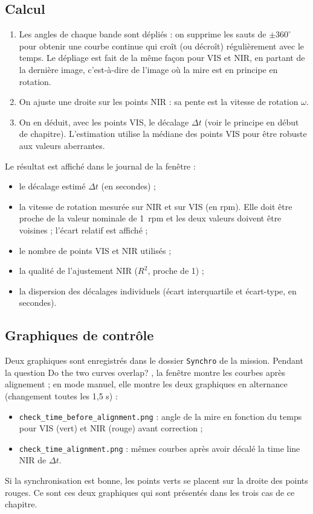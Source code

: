 \documentclass[a4paper,11pt]{report}
\begin{document}
\subsection*{Calcul}
\begin{enumerate}
  \item Les angles de chaque bande sont \og dépliés \fg : on supprime les sauts de $\pm 360^\circ$ pour obtenir une courbe continue qui croît (ou décroît) régulièrement avec le temps. Le dépliage est fait de la même façon pour VIS et NIR, en partant de la dernière image, c'est-à-dire de l'image où la mire est en principe en rotation.
  \item On ajuste une droite sur les points NIR : sa pente est la vitesse de rotation $\omega$.
  \item On en déduit, avec les points VIS, le décalage $\Delta t$ (voir le principe en début de chapitre). L'estimation utilise la médiane des points VIS pour être robuste aux valeurs aberrantes.
\end{enumerate}
Le résultat est affiché dans le journal de la fenêtre :
\begin{itemize}
  \item le décalage estimé $\Delta t$ (en secondes) ;
  \item la vitesse de rotation mesurée sur NIR et sur VIS (en rpm). Elle doit être proche de la valeur nominale de 1~rpm et les deux valeurs doivent être voisines ; l'écart relatif est affiché ;
  \item le nombre de points VIS et NIR utilisés ;
  \item la qualité de l'ajustement NIR ($R^2$, proche de 1) ;
  \item la dispersion des décalages individuels (écart interquartile et écart-type, en secondes).
\end{itemize}

\subsection*{Graphiques de contrôle}
Deux graphiques sont enregistrés dans le dossier \texttt{Synchro} de la mission. Pendant la question \og Do the two curves overlap? \fg, la fenêtre montre les courbes après alignement ; en mode manuel, elle montre les deux graphiques en alternance (changement toutes les 1,5 s) :
\begin{itemize}
  \item \texttt{check\_time\_before\_alignment.png} : angle de la mire en fonction du temps pour VIS (vert) et NIR (rouge) avant correction ;
  \item \texttt{check\_time\_alignment.png} : mêmes courbes après avoir décalé la time line NIR de $\Delta t$.
\end{itemize}
Si la synchronisation est bonne, les points verts se placent sur la droite des points rouges. Ce sont ces deux graphiques qui sont présentés dans les trois cas de ce chapitre.
\end{document}
